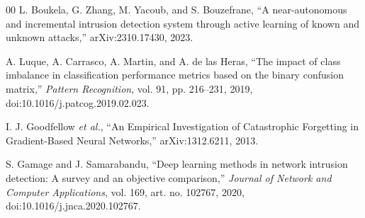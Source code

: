 \documentclass[a4paper,fleqn]{cas-dc}
\begin{document}
\begin{thebibliography}{00}
L. Boukela, G. Zhang, M. Yacoub, and S. Bouzefrane, ``A near-autonomous and incremental intrusion detection system through active learning of known and unknown attacks,'' arXiv:2310.17430, 2023.

A. Luque, A. Carrasco, A. Martin, and A. de las Heras, ``The impact of class imbalance in classification performance metrics based on the binary confusion matrix,'' \textit{Pattern Recognition}, vol. 91, pp. 216--231, 2019, doi:10.1016/j.patcog.2019.02.023.

I. J. Goodfellow \textit{et al.}, ``An Empirical Investigation of Catastrophic Forgetting in Gradient-Based Neural Networks,'' arXiv:1312.6211, 2013.

S. Gamage and J. Samarabandu, ``Deep learning methods in network intrusion detection: A survey and an objective comparison,'' \textit{Journal of Network and Computer Applications}, vol. 169, art. no. 102767, 2020, doi:10.1016/j.jnca.2020.102767.
\end{thebibliography}
\end{document}
